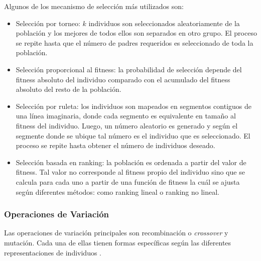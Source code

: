 Algunos de los mecanismo de selección más utilizados son:
\begin{itemize}
    \item Selección por torneo: $k$ individuos son seleccionados aleatoriamente de la población y los mejores de todos ellos son separados en otro grupo. El proceso se repite hasta que el número de padres requeridos es seleccionado de toda la población.
    \item Selección proporcional al fitness: la probabilidad de selección depende del fitness absoluto del individuo comparado con el acumulado del fitness absoluto del resto de la población.
    \item Selección por ruleta: los individuos son mapeados en segmentos contiguos de una línea imaginaria, donde cada segmento es equivalente en tamaño al fitness del individuo. Luego, un número aleatorio es generado y según el segmente donde se ubique tal número es el individuo que es seleccionado. El proceso se repite hasta obtener el número de individuos deseado.
    \item Selección basada en ranking: la población es ordenada a partir del valor de fitness. Tal valor no corresponde al fitness propio del individuo sino que se calcula para cada uno a partir de una función de fitness la cuál se ajusta según diferentes métodos: como ranking lineal o ranking no lineal.
\end{itemize}

\subsubsection{Operaciones de Variación}
Las operaciones de variación principales son recombinación o \emph{crossover} y mutación. Cada una de ellas tienen formas específicas según las diferentes representaciones de individuos \cite{grosan2011intelligent}.

